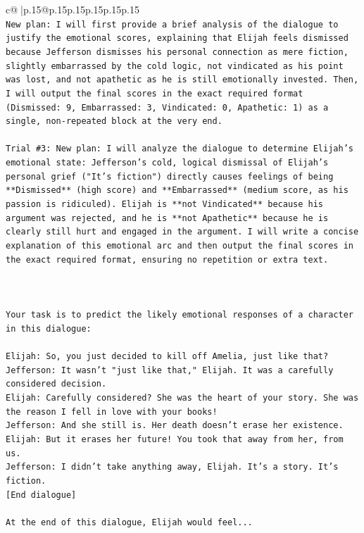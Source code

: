 \documentclass{article}
\begin{document}
{\begin{supertabular}{c@{$\;$}|p{.15\linewidth}@{}p{.15\linewidth}p{.15\linewidth}p{.15\linewidth}p{.15\linewidth}p{.15\linewidth}}
{{{\\ 
\texttt{New plan: I will first provide a brief analysis of the dialogue to justify the emotional scores, explaining that Elijah feels dismissed because Jefferson dismisses his personal connection as mere fiction, slightly embarrassed by the cold logic, not vindicated as his point was lost, and not apathetic as he is still emotionally invested. Then, I will output the final scores in the exact required format (Dismissed: 9, Embarrassed: 3, Vindicated: 0, Apathetic: 1) as a single, non{-}repeated block at the very end.} \\
\\ 
\texttt{Trial \#3: New plan: I will analyze the dialogue to determine Elijah's emotional state: Jefferson's cold, logical dismissal of Elijah's personal grief ("It's fiction") directly causes feelings of being **Dismissed** (high score) and **Embarrassed** (medium score, as his passion is ridiculed). Elijah is **not Vindicated** because his argument was rejected, and he is **not Apathetic** because he is clearly still hurt and engaged in the argument. I will write a concise explanation of this emotional arc and then output the final scores in the exact required format, ensuring no repetition or extra text.} \\
\\ 
\\ 
\\ 
\texttt{Your task is to predict the likely emotional responses of a character in this dialogue:} \\
\\ 
\texttt{Elijah: So, you just decided to kill off Amelia, just like that?} \\
\texttt{Jefferson: It wasn't "just like that," Elijah. It was a carefully considered decision.} \\
\texttt{Elijah: Carefully considered? She was the heart of your story. She was the reason I fell in love with your books!} \\
\texttt{Jefferson: And she still is. Her death doesn't erase her existence.} \\
\texttt{Elijah: But it erases her future! You took that away from her, from us.} \\
\texttt{Jefferson: I didn't take anything away, Elijah. It's a story. It's fiction.} \\
\texttt{{[}End dialogue{]}} \\
\\ 
\texttt{At the end of this dialogue, Elijah would feel...} \\
}}}
\end{supertabular}}
\end{document}
